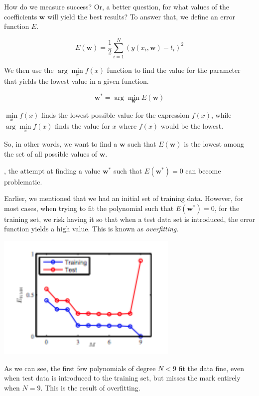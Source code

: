\documentclass{tufte-handout}
\begin{document}
How do we measure success? Or, a better question, for what values of the coefficients $\mathbf{w}$ will yield the best results? To answer that, we define an error function $E$.

\begin{equation}
  E(\mathbf{w}) = \frac{1}{2}\sum\limits_{i = 1}^N(y(x_i, \mathbf{w}) - t_i)^2
\end{equation}

We then use the $\arg\min\limits_{x}f(x)$ function to find the value for the parameter that yields the lowest value in a given function.

\begin{equation}
  \mathbf{w}^* = \arg \min\limits_{\mathbf{w}}E(\mathbf{w})
\end{equation}

$\min\limits_{x} f(x)$ finds the lowest possible value for the
expression $f(x)$, while $\arg\min\limits_{x} f(x)$ finds the value for $x$ where $f(x)$ would be the lowest.

So, in other words, we want to find a $\mathbf{w}$ such that $E(\mathbf{w})$ is the lowest among the set of all possible values of $\mathbf{w}$.

, the attempt at finding a value $\mathbf{w}^*$ such that $E(\mathbf{w}^*) = 0$ can become problematic.

Earlier, we mentioned that we had an initial set of training data. However, for most cases, when trying to fit the polynomial such that $E(\mathbf{w}^*) = 0$, for the training set, we risk having it so that when a test data set is introduced, the error function yields a high value. This is known as \textit{overfitting}.

\begin{marginfigure}
  \includegraphics[width=\linewidth]{overfitting.png}
  \caption{As we can see, the first few polynomials of degree $N < 9$ fit the
    data fine, even when test data is introduced to the training set, but misses the mark entirely when $N = 9$. This is the result of overfitting.}
\end{marginfigure}
\end{document}
